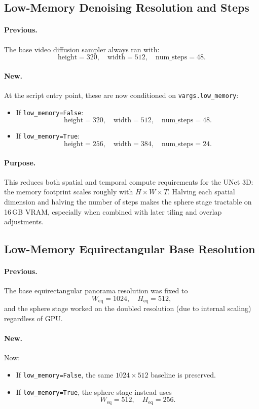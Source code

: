 \documentclass[11pt,a4paper]{article}
\newcommand{\fn}[1]{\texttt{#1}}
\begin{document}
\subsection{Low-Memory Denoising Resolution and Steps}

\paragraph{Previous.}
The base video diffusion sampler always ran with:
\[
    \text{height}=320,\quad \text{width}=512,\quad \text{num\_steps}=48.
\]

\paragraph{New.}
At the script entry point, these are now conditioned on \fn{vargs.low\_memory}:
\begin{itemize}
    \item If \fn{low\_memory=False}:
    \[
        \text{height}=320,\quad \text{width}=512,\quad \text{num\_steps}=48.
    \]
    \item If \fn{low\_memory=True}:
    \[
        \text{height}=256,\quad \text{width}=384,\quad \text{num\_steps}=24.
    \]
\end{itemize}

\paragraph{Purpose.}
This reduces both spatial and temporal compute requirements for the UNet 3D:
the memory footprint scales roughly with \(H \times W \times T\).
Halving each spatial dimension and halving the number of steps makes the sphere stage tractable on 16\,GB VRAM, especially when combined with later tiling and overlap adjustments.

\subsection{Low-Memory Equirectangular Base Resolution}

\paragraph{Previous.}
The base equirectangular panorama resolution was fixed to
\[
    W_\text{eq}=1024,\quad H_\text{eq}=512,
\]
and the sphere stage worked on the doubled resolution (due to internal scaling) regardless of GPU.

\paragraph{New.}
Now:
\begin{itemize}
    \item If \fn{low\_memory=False}, the same \(1024\times512\) baseline is preserved.
    \item If \fn{low\_memory=True}, the sphere stage instead uses
    \[
        W_\text{eq}=512,\quad H_\text{eq}=256.
    \]
\end{itemize}
\end{document}
